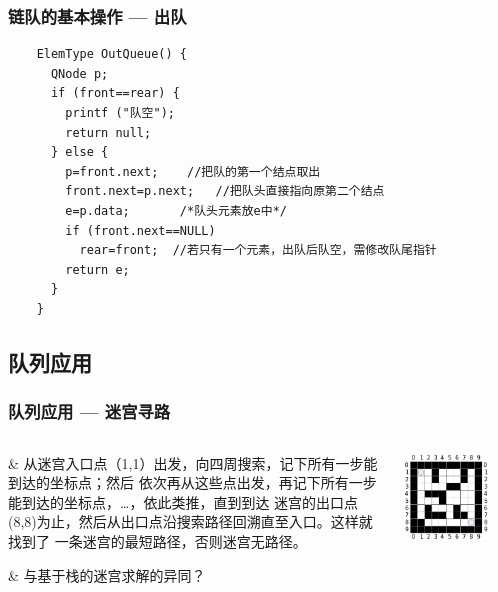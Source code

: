 \begin{frame}[fragile]
  \frametitle{链队的基本操作 --- 出队}
  

  \begin{verbatim}
    ElemType OutQueue() {
      QNode p;
      if (front==rear) {
        printf ("队空");
        return null;
      } else {
        p=front.next;    //把队的第一个结点取出
        front.next=p.next;   //把队头直接指向原第二个结点
        e=p.data;       /*队头元素放e中*/
        if (front.next==NULL)
          rear=front;  //若只有一个元素，出队后队空，需修改队尾指针
        return e;
      }
    }
  \end{verbatim}
\end{frame}


\subsection{队列应用}

\begin{frame}[fragile]
  \frametitle{队列应用 --- 迷宫寻路}
  \begin{columns}
    \begin{column}[T]{0.6\linewidth}
      \begin{easylist}
        & 从迷宫入口点（1,1）出发，向四周搜索，记下所有一步能到达的坐标点；然后
        依次再从这些点出发，再记下所有一步能到达的坐标点，…，依此类推，直到到达
        迷宫的出口点(8,8)为止，然后从出口点沿搜索路径回溯直至入口。这样就找到了
        一条迷宫的最短路径，否则迷宫无路径。

        & 与基于栈的迷宫求解的异同？
      \end{easylist}
    \end{column}
    \begin{column}[T]{0.4\linewidth}
      \includegraphics[width=0.8\textwidth]{figs/stack/maze.png}
    \end{column}
  \end{columns}
\end{frame}

